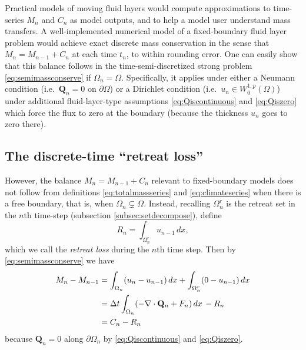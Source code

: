 \documentclass[final,leqno,onefignum,onetabnum]{siamltex1213bueler}
\newcommand\bQ{\mathbf{Q}}
\newcommand{\Div}{\nabla\cdot}
\begin{document}
Practical models of moving fluid layers would compute approximations to time-series $M_n$ and $C_n$ as model outputs, and to help a model user understand mass transfers.  A well-implemented numerical model of a fixed-boundary fluid layer problem would achieve exact discrete mass conservation in the sense that $M_n = M_{n-1} + C_n$ at each time $t_n$, to within rounding error.  One can easily show that this balance follows in the time-semi-discretized strong problem \eqref{eq:semimassconserve} if $\Omega_n=\Omega$.  Specifically, it applies under either a Neumann condition (i.e.~$\bQ_n=0$ on $\partial \Omega$) or a Dirichlet condition (i.e.~$u_n\in W_0^{1,p}(\Omega)$) under additional fluid-layer-type assumptions \eqref{eq:Qiscontinuous} and \eqref{eq:Qiszero} which force the flux to zero at the boundary (because the thickness $u_n$ goes to zero there).

\subsection{The discrete-time ``retreat loss''}  \label{subsec:retreatloss}  However, the balance $M_n = M_{n-1} + C_n$ relevant to fixed-boundary models does not follow from definitions \eqref{eq:totalmassseries} and \eqref{eq:climateseries} when there is a free boundary, that is, when $\Omega_n \subsetneq \Omega$.  Instead, recalling $\Omega_n^r$ is the retreat set in the $n$th time-step (subsection \ref{subsec:setdecompose}), define
\begin{equation}
R_n = \int_{\Omega_n^r} u_{n-1}\,dx, \label{eq:retreatlossseries}
\end{equation}
which we call the \emph{retreat loss} during the $n$th time step.  Then by \eqref{eq:semimassconserve} we have
\begin{align}
M_n - M_{n-1} &= \int_{\Omega_n} (u_n - u_{n-1})\,dx + \int_{\Omega_n^r} (0 - u_{n-1})\,dx \label{eq:newbalance} \\
   &= \Delta t \int_{\Omega_n} (- \Div \bQ_n + F_n) \,dx \, - R_n \notag \\
   &= C_n - R_n \notag
\end{align}
because $\bQ_n=0$ along $\partial \Omega_n$ by \eqref{eq:Qiscontinuous} and \eqref{eq:Qiszero}.
\end{document}
